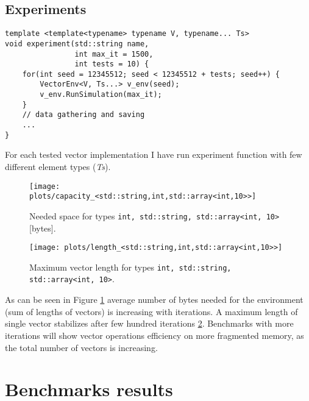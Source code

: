 \documentclass[inz, english, shortabstract]{iithesis}
\begin{document}
\section {Experiments}
\begin{lstlisting}[caption=experiment function]
template <template<typename> typename V, typename... Ts>
void experiment(std::string name, 
				int max_it = 1500, 
				int tests = 10) {
	for(int seed = 12345512; seed < 12345512 + tests; seed++) {
		VectorEnv<V, Ts...> v_env(seed);
		v_env.RunSimulation(max_it);
	}
	// data gathering and saving
	...
}
\end{lstlisting}
For each tested vector implementation I have run experiment function with few different element types ({\it Ts}). 

\begin{figure}[h!]
\texttt{[image: plots/capacity\_<std::string,int,std::array<int,10>>]}
\caption{Needed space for types \lstinline{int, std::string, std::array<int, 10>} [bytes].}
\label{space_consumption}
\end{figure}

\begin{figure}[h!]
\texttt{[image: plots/length\_<std::string,int,std::array<int,10>>]}
\caption{Maximum vector length for types \lstinline{int, std::string, std::array<int, 10>}.}
\label{vector_length}
\end{figure}


As can be seen in Figure \ref{space_consumption} average number of bytes needed for the environment (sum of lengths of vectors) is increasing with iterations. A maximum length of single vector stabilizes after few hundred iterations \ref{vector_length}. Benchmarks with more iterations will show vector operations efficiency on more fragmented memory, as the total number of vectors is increasing.

\chapter{Benchmarks results}
\end{document}
